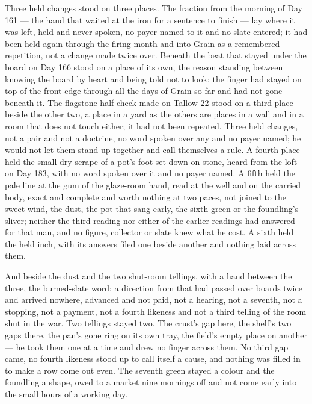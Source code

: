 Three held changes stood on three places. The fraction from the morning of Day 161 --- the hand that waited at the iron for a sentence to finish --- lay where it was left, held and never spoken, no payer named to it and no slate entered; it had been held again through the firing month and into Grain as a remembered repetition, not a change made twice over. Beneath  the beat that stayed under the board on Day 166 stood on a place of its own, the reason standing between knowing the board by heart and being told not to look; the finger had stayed on top of the front edge through all the days of Grain so far and had not gone beneath it. The flagstone half-check made on Tallow 22 stood on a third place beside the other two, a place in a yard as the others are places in a wall and in a room that does not touch either; it had not been repeated. Three held changes, not a pair and not a doctrine, no word spoken over any and no payer named; he would not let them stand up together and call themselves a rule. A fourth place held the small dry scrape of a pot's foot set down on stone, heard from the loft on Day 183, with no word spoken over it and no payer named. A fifth held the pale line at the gum of the glaze-room hand, read at the well and on the carried body, exact and complete and worth nothing at two paces, not joined to the sweet wind, the dust, the pot that sang early, the sixth green or the foundling's sliver; neither the third reading nor either of the earlier readings had answered for that man, and no figure, collector or slate knew what he cost. A sixth held the held inch, with its answers filed one beside another and nothing laid across them.

And beside the dust and the two shut-room tellings, with a hand between the three, the burned-slate word: a direction from  that had passed over boards twice and arrived nowhere, advanced and not paid, not a hearing, not a seventh, not a stopping, not a payment, not a fourth likeness and not a third telling of the room shut in the war. Two tellings stayed two. The crust's gap here, the shelf's two gaps there, the pan's gone ring on its own tray, the field's empty place on another --- he took them one at a time and drew no finger across them. No third gap came, no fourth likeness stood up to call itself a cause, and nothing was filled in to make a row come out even. The seventh green stayed a colour and the foundling a shape, owed to a market nine mornings off and not come early into the small hours of a working day.

